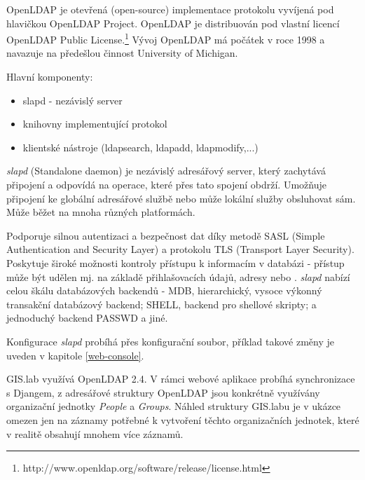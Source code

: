 OpenLDAP je otevřená (open-source) implementace protokolu  vyvíjená pod hlavičkou OpenLDAP Project. OpenLDAP je distribuován pod vlastní licencí OpenLDAP Public License.\footnote{http://www.openldap.org/software/release/license.html} Vývoj OpenLDAP má počátek v roce 1998 a navazuje na předešlou činnost University of Michigan. 

Hlavní komponenty:
\begin{itemize}
\item slapd - nezávislý  server
\item knihovny implementující  protokol
\item klientské nástroje (ldapsearch, ldapadd, ldapmodify,...)
\end{itemize}

\textit{slapd} (Standalone  daemon) je nezávislý  adresářový server, který zachytává připojení a odpovídá na operace, které přes tato spojení obdrží. Umožňuje připojení ke globální  adresářové službě nebo může lokální služby obsluhovat sám. Může běžet na mnoha různých platformách.

Podporuje silnou autentizaci a bezpečnost dat díky metodě SASL (Simple Authentication and Security Layer) a protokolu TLS (Transport Layer Security). Poskytuje široké možnosti kontroly přístupu k informacím v databázi - přístup může být udělen  mj. na základě přihlašovacích údajů,  adresy nebo . \textit{slapd} nabízí celou škálu databázových backendů - MDB, hierarchický, vysoce výkonný transakční databázový backend; SHELL, backend pro shellové skripty; a jednoduchý backend PASSWD a jiné. 

Konfigurace \textit{slapd} probíhá přes konfigurační soubor, příklad takové změny je uveden v kapitole \ref{web-console}. 


GIS.lab využívá OpenLDAP 2.4. V rámci webové aplikace probíhá synchronizace s Djangem, z adresářové struktury OpenLDAP jsou konkrétně využívány organizační jednotky \textit{People} a \textit{Groups}. Náhled struktury GIS.labu je v ukázce omezen jen na záznamy potřebné k vytvoření  těchto organizačních jednotek, které v realitě obsahují mnohem více záznamů.


